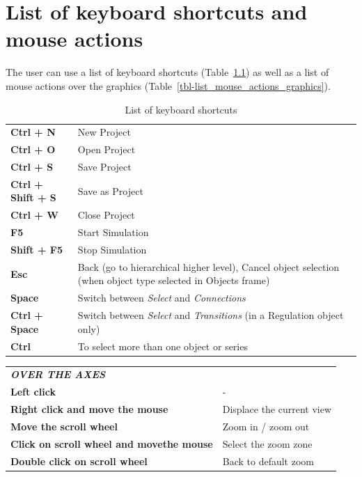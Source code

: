 \documentclass[
  letterpaper,
  DIV=11,
  numbers=noendperiod]{scrreprt}
\begin{document}
\hypertarget{list-of-keyboard-shortcuts-and-mouse-actions}{%
\chapter{List of keyboard shortcuts and mouse
actions}\label{list-of-keyboard-shortcuts-and-mouse-actions}}

The user can use a list of keyboard shortcuts
(Table~\ref{tbl-list_keyboard_shortcuts}) as well as a list of mouse
actions over the graphics (Table~\ref{tbl-list_mouse_actions_graphics}).

\hypertarget{tbl-list_keyboard_shortcuts}{}
\begin{longtable}[]{@{}
  >{\raggedright\arraybackslash}p{}
  >{\raggedright\arraybackslash}p{}@{}}
\caption{\label{tbl-list_keyboard_shortcuts}List of keyboard
shortcuts}\tabularnewline
\toprule()
\endhead
\textbf{Ctrl + N} & New Project \\
\textbf{Ctrl + O} & Open Project \\
\textbf{Ctrl + S} & Save Project \\
\textbf{Ctrl + Shift + S} & Save as Project \\
\textbf{Ctrl + W} & Close Project \\
\textbf{F5} & Start Simulation \\
\textbf{Shift + F5} & Stop Simulation \\
\textbf{Esc} & Back (go to hierarchical higher level), Cancel object
selection (when object type selected in Objects frame) \\
\textbf{Space} & Switch between \emph{Select} and \emph{Connections} \\
\textbf{Ctrl + Space} & Switch between \emph{Select} and
\emph{Transitions} (in a Regulation object only) \\
\textbf{Ctrl} & To select more than one object or series \\
\bottomrule()
\end{longtable}

\begin{longtable}[]{@{}
  >{\raggedright\arraybackslash}p{}
  >{\raggedright\arraybackslash}p{}@{}}
\toprule()
\endhead
\textbf{\emph{OVER THE AXES}} & \\
\textbf{Left click} & - \\
\textbf{Right click and move the mouse} & Displace the current view \\
\textbf{Move the scroll wheel} & Zoom in / zoom out \\
\textbf{Click on scroll wheel and movethe mouse} & Select the zoom
zone \\
\textbf{Double click on scroll wheel} & Back to default zoom \\
\bottomrule()
\end{longtable}
\end{document}
